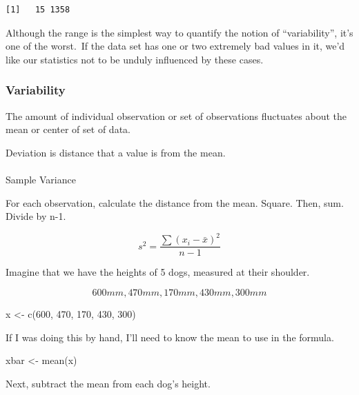 \documentclass[
  letterpaper,
  DIV=11,
  numbers=noendperiod]{scrartcl}
\makeatletter
\let\oldparagraph\paragraph
\renewcommand{\paragraph}{
    \@ifstar
      \xxxParagraphStar
      \xxxParagraphNoStar
  }
\newcommand{\xxxParagraphStar}[1]{\oldparagraph*{#1}\mbox{}}
\newcommand{\xxxParagraphNoStar}[1]{\oldparagraph{#1}\mbox{}}
\newenvironment{Shaded}{\begin{snugshade}}{\end{snugshade}}
\newcommand{\DecValTok}[1]{\textcolor[rgb]{0.68,0.00,0.00}{#1}}
\newcommand{\FunctionTok}[1]{\textcolor[rgb]{0.28,0.35,0.67}{#1}}
\newcommand{\NormalTok}[1]{\textcolor[rgb]{0.00,0.23,0.31}{#1}}
\newcommand{\OtherTok}[1]{\textcolor[rgb]{0.00,0.23,0.31}{#1}}
\makeatother
\begin{document}
\begin{verbatim}
[1]   15 1358
\end{verbatim}

Although the range is the simplest way to quantify the notion of
``variability'', it's one of the worst.~If the data set has one or two
extremely bad values in it, we'd like our statistics not to be unduly
influenced by these cases.

\subsubsection{Variability}\label{variability}

The amount of individual observation or set of observations fluctuates
about the mean or center of set of data.

Deviation is distance that a value is from the mean.

\paragraph{Sample Variance}\label{sample-variance}

For each observation, calculate the distance from the mean. Square.
Then, sum. Divide by n-1.

\[s^2 = \frac{\sum (x_i - \bar{x})^2}{n - 1}\]

Imagine that we have the heights of 5 dogs, measured at their shoulder.

\[600mm, 470mm, 170mm, 430mm, 300mm\]

\begin{Shaded}
\begin{Highlighting}[]
\NormalTok{x }\OtherTok{\textless{}{-}} \FunctionTok{c}\NormalTok{(}\DecValTok{600}\NormalTok{, }\DecValTok{470}\NormalTok{, }\DecValTok{170}\NormalTok{, }\DecValTok{430}\NormalTok{, }\DecValTok{300}\NormalTok{)}
\end{Highlighting}
\end{Shaded}

If I was doing this by hand, I'll need to know the mean to use in the
formula.

\begin{Shaded}
\begin{Highlighting}[]
\NormalTok{xbar }\OtherTok{\textless{}{-}} \FunctionTok{mean}\NormalTok{(x)}
\end{Highlighting}
\end{Shaded}

Next, subtract the mean from each dog's height.
\end{document}
